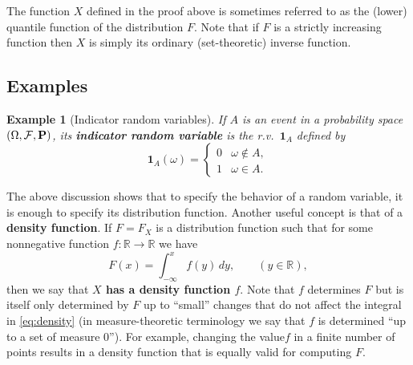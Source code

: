 \documentclass[12pt]{article}
\newcommand{\R}{\mathbb{R}}
\newcommand{\prob}{\mathbf{P}}
\newcommand{\ind}{\textbf{1}}
\theoremstyle{example}
\newtheorem{example}[thm]{Example}
\begin{document}
The function $X$ defined in the proof above is sometimes referred to as the (lower) quantile function of the distribution $F$. Note that if $F$ is a strictly increasing function then $X$ is simply its ordinary (set-theoretic) inverse function.

\subsection{Examples}

\begin{example}[Indicator random variables] If $A$ is an event in a probability space $(\Omega, {\cal F}, \prob)$, its \textbf{indicator random variable} is the r.v.\ $\ind_A$ defined by
$$ \ind_A(\omega) = \begin{cases} 0 & \omega \notin A, \\ 1 & \omega \in A. \end{cases} $$
\end{example}

The above discussion shows that to specify the behavior of a random variable, it is enough to specify its distribution function. Another useful concept is that of a \textbf{density function}. If $F=F_X$ is a distribution function such that for some nonnegative function $f:\R\to\R$ we have
\begin{equation} \label{eq:density}
 F(x) = \int_{-\infty}^x f(y)\,dy, \qquad (y\in\R),
 \end{equation}
then we say that \textbf{$X$ has a density function $f$}. Note that $f$ determines $F$ but is itself only determined by $F$ up to ``small'' changes that do not affect the integral in \eqref{eq:density} (in measure-theoretic terminology we say that $f$ is determined ``up to a set of measure $0$''). For example, changing the value$f$ in a finite number of points results in a density function that is equally valid for computing $F$.
\end{document}
